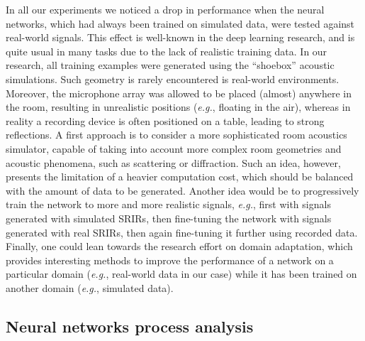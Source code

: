 In all our experiments we noticed a drop in performance when the neural networks, which had always been trained on simulated data, were tested against real-world signals. This effect is well-known in the deep learning research, and is quite usual in many tasks due to the lack of realistic training data. In our research, all training examples were generated using the ``shoebox'' acoustic simulations. Such geometry is rarely encountered is real-world environments. Moreover, the microphone array was allowed to be placed (almost) anywhere in the room, resulting in unrealistic positions (\emph{e.g.}, floating in the air), whereas in reality a recording device is often positioned on a table, leading to strong reflections. A first approach is to consider a more sophisticated room acoustics simulator, capable of taking into account more complex room geometries and acoustic phenomena, such as scattering or diffraction.
Such an idea, however, presents the limitation of a heavier computation cost, which should be balanced with the amount of data to be generated. Another idea would be to progressively train the network to more and more realistic signals, \emph{e.g.}, first with signals generated with simulated SRIRs, then fine-tuning the network with signals generated with real SRIRs, then again fine-tuning it further using recorded data. Finally, one could lean towards the research effort on domain adaptation, which provides interesting methods to improve the performance of a network on a particular domain (\emph{e.g.}, real-world data in our case) while it has been trained on another domain (\emph{e.g.}, simulated data).

\subsection{Neural networks process analysis}

